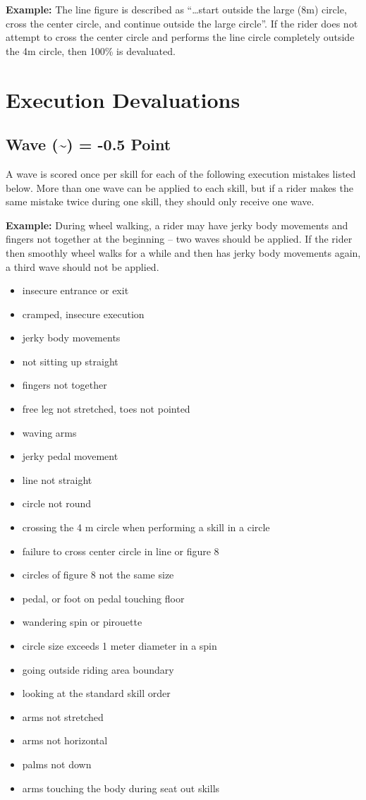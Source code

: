 \textbf{Example:} The line figure is described as ``…start outside the large (8m) circle, cross the center circle, and continue outside the large circle''.
If the rider does not attempt to cross the center circle and performs the line circle completely outside the 4m circle, then 100\% is devaluated.

\section{Execution Devaluations}

\subsection{Wave (\textasciitilde) = -0.5 Point}

A wave is scored once per skill for each of the following execution mistakes listed below.
More than one wave can be applied to each skill, but if a rider makes the same mistake twice during one skill, they should only receive one wave.

\textbf{Example:} During wheel walking, a rider may have jerky body movements and fingers not together at the beginning – two waves should be applied.
If the rider then smoothly wheel walks for a while and then has jerky body movements again, a third wave should not be applied.
\begin{itemize}
\item insecure entrance or exit 
\item cramped, insecure execution 
\item jerky body movements 
\item not sitting up straight 
\item fingers not together 
\item free leg not stretched, toes not pointed 
\item waving arms 
\item jerky pedal movement 
\item line not straight 
\item circle not round 
\item crossing the 4 m circle when performing a skill in a circle 
\item failure to cross center circle in line or figure 8 
\item circles of figure 8 not the same size 
\item pedal, or foot on pedal touching floor 
\item wandering spin or pirouette 
\item circle size exceeds 1 meter diameter in a spin 
\item going outside riding area boundary 
\item looking at the standard skill order 
\item arms not stretched 
\item arms not horizontal 
\item palms not down 
\item arms touching the body during seat out skills
\end{itemize}


